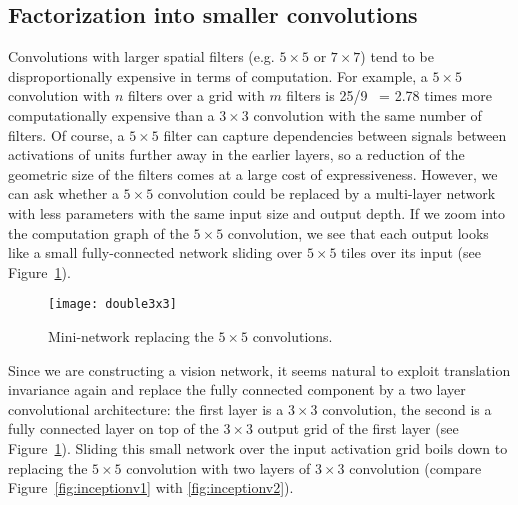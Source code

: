 \documentclass[10pt,twocolumn,letterpaper]{article}
\begin{document}
\subsection{Factorization into smaller convolutions}
\label{factorizing}
Convolutions with larger spatial filters (e.g. $5\times 5$ or
$7\times 7$) tend to be disproportionally expensive in terms of computation.
For example, a $5\times 5$ convolution
with $n$ filters over a grid with $m$ filters is 25/9 ~= 2.78 times
more computationally expensive
than a $3\times 3$ convolution with the same number of filters. Of course, a
$5\times 5$
filter can capture dependencies between signals between activations of units
further away in the earlier layers, so a reduction of the geometric size of the
filters comes at a large cost of expressiveness. However,
we can ask whether a $5\times 5$ convolution could be
replaced by a multi-layer network with less parameters with the same input
size and output depth. If we zoom into the computation graph of the
$5\times 5$ convolution, we see that each output looks like a small
fully-connected network sliding over $5\times 5$ tiles over its input
(see Figure~\ref{fig:double3}).
\begin{figure}
\centering
\texttt{[image: double3x3]}
\caption{Mini-network replacing the $5\times 5$ convolutions.}
\label{fig:double3}
\end{figure}
Since we are constructing a vision network, it seems natural to
exploit translation invariance again and replace the fully connected component
by a two layer convolutional architecture: the first layer is a $3\times 3$
convolution, the second is a fully connected layer on top of the $3\times 3$
output grid of the first layer (see Figure~\ref{fig:double3}).
Sliding this small network over the input activation grid boils down to
replacing the $5\times 5$ convolution with two layers of $3\times 3$
convolution (compare Figure~\ref{fig:inceptionv1} with \ref{fig:inceptionv2}).
\end{document}
